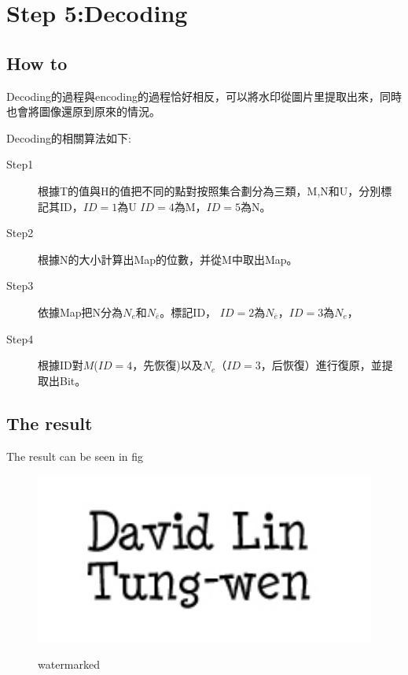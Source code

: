 \documentclass[a4paper,12pt]{article}%
\begin{document}
\section{Step 5:Decoding}
    \subsection{How to}
Decoding的過程與encoding的過程恰好相反，可以將水印從圖片里提取出來，同時也會將圖像還原到原來的情況。

Decoding的相關算法如下:
\begin{description}
      \item[Step1]根據T的值與H的值把不同的點對按照集合劃分為三類，M,N和U，分別標記其ID，$ID=1$為U
$ID=4$為M，$ID=5$為N。
      \item[Step2]根據N的大小計算出Map的位數，并從M中取出Map。
      \item[Step3]依據Map把N分為$N_e$和$N_{\bar{e}}$。標記ID，
$ID=2$為$N_{\bar{e}}$，$ID=3$為$N_e$，
      \item[Step4]根據ID對$M$($ID=4$，先恢復)以及$N_e$（$ID=3$，后恢復）進行復原，並提取出Bit。
\end{description}
\subsection{The result}
The result can be seen in fig
\begin{figure}
  \centering
  \includegraphics[width=5in]{./figure/myname.JPG}\\
  \caption{watermarked}\label{fig:marked}
\end{figure}
\end{document}
